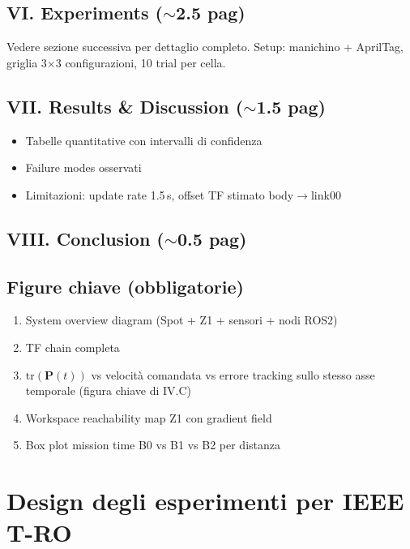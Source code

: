 \documentclass[a4paper,11pt]{article}
\begin{document}
\subsection*{VI. Experiments ($\sim$2.5 pag)}
Vedere sezione successiva per dettaglio completo.
Setup: manichino + AprilTag, griglia 3$\times$3 configurazioni, 10 trial per cella.

\subsection*{VII. Results \& Discussion ($\sim$1.5 pag)}
\begin{itemize}
  \item Tabelle quantitative con intervalli di confidenza
  \item Failure modes osservati
  \item Limitazioni: update rate 1.5\,s, offset TF stimato body$\to$link00
\end{itemize}

\subsection*{VIII. Conclusion ($\sim$0.5 pag)}

\subsection*{Figure chiave (obbligatorie)}
\begin{enumerate}
  \item System overview diagram (Spot + Z1 + sensori + nodi ROS2)
  \item TF chain completa
  \item $\mathrm{tr}(\mathbf{P}(t))$ vs velocità comandata vs errore tracking
        sullo stesso asse temporale (figura chiave di IV.C)
  \item Workspace reachability map Z1 con gradient field
  \item Box plot mission time B0 vs B1 vs B2 per distanza
\end{enumerate}

\section{Design degli esperimenti per IEEE T-RO}
\end{document}
